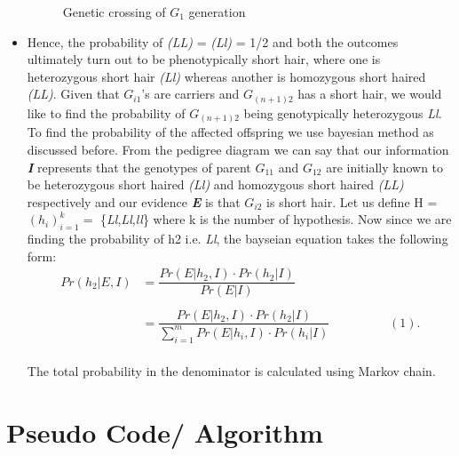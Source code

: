 \documentclass{article}
\begin{document}
\begin{itemize}
\begin{figure}[h]
\begin{minipage}[b]{0.32\textwidth}
			\caption{Genetic crossing of $ G_1 $ generation}
		\end{minipage}
	\end{figure}
  
  \item Hence, the probability of \textit{(LL)} = \textit{(Ll)} = 1/2 and both the outcomes ultimately turn out to be phenotypically short hair, where one is heterozygous short hair \textit{(Ll)} whereas another is homozygous short haired \textit{(LL)}. Given that $ G_{i1} $'s are carriers and $ G_{(n+1)2} $ has a short hair, we would like to find the probability of $ G_{(n+1)2} $ being genotypically heterozygous \textit{Ll}.\\
  To find the probability of the affected offspring we use bayesian method as discussed before. From the pedigree diagram we can say that our information \textbf{\textit{I}} represents that
  the genotypes of parent $ G_{11} $  and $ G_{12} $  are initially known to be heterozygous short haired \textit{(Ll)} and homozygous short haired \textit{(LL)} respectively and our evidence \textbf{\textit{E}} is that $ G_{i2} $ is short hair. Let us define H = {$ (h_{i})^{k}_{i=1} =$} \{\textit{Ll},\textit{Ll},\textit{ll}\} where k is the number of hypothesis. Now since we are finding the probability of h2 i.e. \textit{Ll}, the bayseian equation takes the following form:
  \begin{align*}      
  Pr(h_2|E,I) &= \dfrac{Pr(E|h_2,I)\cdot Pr(h_2|I)}{Pr(E|I)}\\\\
  &= \dfrac{Pr(E|h_2,I)\cdot Pr(h_2|I)}{\sum_{i=1}^{m}Pr(E|h_i,I)\cdot Pr(h_i|I)} \hspace{2cm} (1).
  \end{align*}\\
  The total probability in the denominator is calculated using Markov chain.
\end{itemize}

\section{Pseudo Code/ Algorithm }
\end{document}
